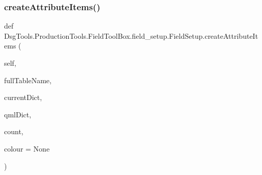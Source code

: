 \subsubsection{\texorpdfstring{create\+Attribute\+Items()}{createAttributeItems()}}
{\footnotesize\ttfamily def Dsg\+Tools.\+Production\+Tools.\+Field\+Tool\+Box.\+field\+\_\+setup.\+Field\+Setup.\+create\+Attribute\+Items (\begin{DoxyParamCaption}\item[{}]{self,  }\item[{}]{full\+Table\+Name,  }\item[{}]{current\+Dict,  }\item[{}]{qml\+Dict,  }\item[{}]{count,  }\item[{}]{colour = {\ttfamily None} }\end{DoxyParamCaption})}

